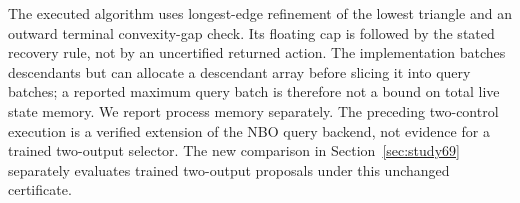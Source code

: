 The executed algorithm uses longest-edge refinement of the lowest triangle and an outward terminal convexity-gap check. Its floating cap is followed by the stated recovery rule, not by an uncertified returned action. The implementation batches descendants but can allocate a descendant array before slicing it into query batches; a reported maximum query batch is therefore not a bound on total live state memory. We report process memory separately. The preceding two-control execution is a verified extension of the NBO query backend, not evidence for a trained two-output selector. The new comparison in Section~\ref{sec:study69} separately evaluates trained two-output proposals under this unchanged certificate.
